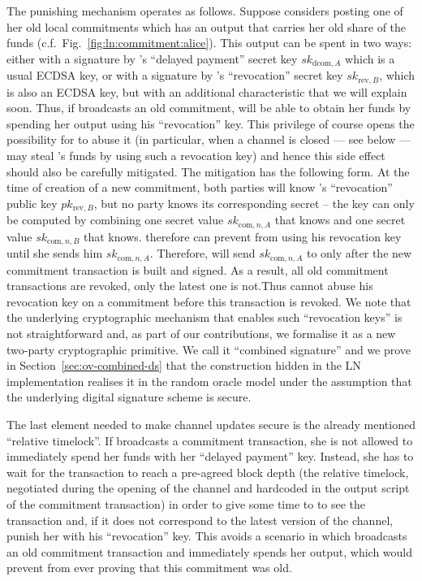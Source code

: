     The punishing mechanism operates as follows. Suppose \alice{} considers
    posting one of her old local commitments which has an output that carries her old
    share of the funds (c.f.\ Fig.~\ref{fig:ln:commitment:alice}). This output
    can be spent in two ways: either with a
    signature by \alice's ``delayed payment'' secret key
    $sk_{\mathrm{dcom}, A}$ which is a usual ECDSA key, or with a
    signature by \bob's ``revocation'' secret key $sk_{\mathrm{rev},
    B}$, which is also an ECDSA key, but with an additional characteristic that
    we will explain soon. Thus, if \alice{} broadcasts an old commitment, \bob{}
    will be able to obtain her funds by spending her output using his
    ``revocation'' key. This privilege of course opens the possibility for
    \bob{} to abuse it (in particular, when a channel is closed --- see below
    --- \bob{} may steal \alice's funds by using such a revocation key) and
    hence this side effect should also be carefully mitigated. The mitigation
    has the following form. At the time of creation of a new commitment, both
    parties will know \bob's ``revocation'' public key $pk_{\mathrm{rev}, B}$,
    but no party knows its corresponding secret -- the key can only be computed
    by combining one secret value $sk_{\mathrm{com}, n, A}$ that
    \alice{} knows and one secret value $sk_{\mathrm{com}, n, B}$ that
    \bob{} knows. \alice{} therefore can prevent \bob{} from using his
    revocation key until she sends him $sk_{\mathrm{com}, n, A}$.
    Therefore, \alice{} will send $sk_{\mathrm{com}, n, A}$ to \bob{} only
    after the new commitment transaction is built and signed. As a result, all
    old commitment transactions are revoked, only the latest one is not.Thus
    \bob{} cannot
    abuse his revocation key on a commitment before this transaction is revoked.
    We note that the underlying cryptographic mechanism  that enables such
    ``revocation keys'' is not straightforward and, as part of our
    contributions, we formalise it as a new two-party cryptographic primitive.
    We call it ``combined signature'' and we prove in
    Section~\ref{sec:ov-combined-ds} that the construction hidden
    in the LN implementation realises it in the random oracle model under the
    assumption that the underlying digital signature scheme is secure.

    The last element needed to make channel updates secure is the
    already mentioned ``relative timelock''. If \alice{} broadcasts a
    commitment transaction, she is not allowed to immediately spend her funds
    with her ``delayed payment'' key. Instead, she has to wait for the
    transaction to reach a pre-agreed block depth (the relative timelock,
    negotiated during the opening of the channel and hardcoded in the
    output script of the commitment transaction) in order to give some time to
    \bob{} to see the transaction and, if it does not correspond to the latest
    version of the channel, punish her with his ``revocation'' key. This avoids
    a scenario in which \alice{} broadcasts an old commitment transaction and
    immediately spends her output, which would prevent \bob{} from ever proving
    that this commitment was old.

